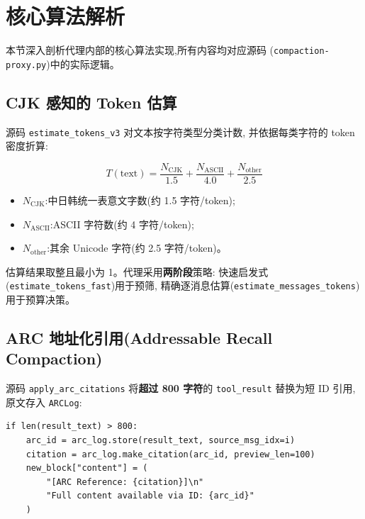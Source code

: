 \documentclass[11pt,a4paper]{article}
\begin{document}
\newpage
\section{核心算法解析}

本节深入剖析代理内部的核心算法实现,所有内容均对应源码
(\texttt{compaction-proxy.py})中的实际逻辑。

\subsection{CJK 感知的 Token 估算}

源码 \texttt{estimate\_tokens\_v3} 对文本按字符类型分类计数,
并依据每类字符的 token 密度折算:

\begin{equation}
  T(\text{text}) = \frac{N_{\text{CJK}}}{1.5}
  + \frac{N_{\text{ASCII}}}{4.0}
  + \frac{N_{\text{other}}}{2.5}
  \label{eq:token-estimate}
\end{equation}

\begin{itemize}
  \item $N_{\text{CJK}}$:中日韩统一表意文字数(约 1.5 字符/token);
  \item $N_{\text{ASCII}}$:ASCII 字符数(约 4 字符/token);
  \item $N_{\text{other}}$:其余 Unicode 字符(约 2.5 字符/token)。
\end{itemize}

估算结果取整且最小为 1。代理采用\textbf{两阶段}策略:
快速启发式(\texttt{estimate\_tokens\_fast})用于预筛,
精确逐消息估算(\texttt{estimate\_messages\_tokens})用于预算决策。

\subsection{ARC 地址化引用(Addressable Recall Compaction)}

源码 \texttt{apply\_arc\_citations} 将\textbf{超过 800 字符}的
\texttt{tool\_result} 替换为短 ID 引用,原文存入 \texttt{ARCLog}:

\begin{lstlisting}[language={}]
if len(result_text) > 800:
    arc_id = arc_log.store(result_text, source_msg_idx=i)
    citation = arc_log.make_citation(arc_id, preview_len=100)
    new_block["content"] = (
        "[ARC Reference: {citation}]\n"
        "Full content available via ID: {arc_id}"
    )
\end{lstlisting}
\end{document}
